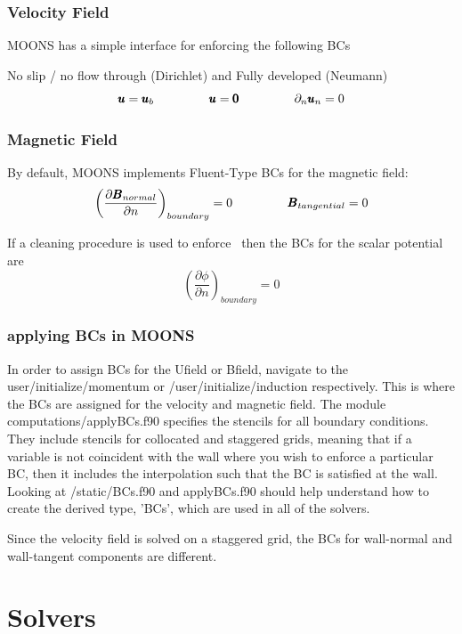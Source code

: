 \subsubsection{Velocity Field}
MOONS has a simple interface for enforcing the following BCs

No slip / no flow through (Dirichlet) and Fully developed (Neumann)
\begin{equation*}
\pmb{u} = \pmb{u}_{b} \;\;\;\;\;\;\;\;\;\;\;\;\;\;\;\;
\pmb{u} = \pmb{0} \;\;\;\;\;\;\;\;\;\;\;\;\;\;\;\;
\partial_n \pmb{u}_n = 0
\end{equation*}

\subsubsection{Magnetic Field}
By default, MOONS implements Fluent-Type BCs for the magnetic field:
\begin{equation*} 
\left( \frac{\partial \pmb{B}_{normal}}{\partial n} \right)_{boundary} = 0 \;\;\;\;\;\;\;\;\;\;\;\;\;\;\;\;
\pmb{B}_{tangential} = 0
\end{equation*}

If a cleaning procedure is used to enforce \divBz\, then the BCs for the scalar potential are
\begin{equation*}
\left(\frac{\partial \phi}{\partial n} \right)_{boundary} = 0
\end{equation*}

\subsubsection{applying BCs in MOONS}
In order to assign BCs for the Ufield or Bfield, navigate to the user/initialize/momentum or /user/initialize/induction respectively. This is where the BCs are assigned for the velocity and magnetic field. The module computations/applyBCs.f90 specifies the stencils for all boundary conditions. They include stencils for collocated and staggered grids, meaning that if a variable is not coincident with the wall where you wish to enforce a particular BC, then it includes the interpolation such that the BC is satisfied at the wall. Looking at /static/BCs.f90 and applyBCs.f90 should help understand how to create the derived type, 'BCs', which are used in all of the solvers.

Since the velocity field is solved on a staggered grid, the BCs for wall-normal and wall-tangent components are different.

\section{Solvers}
